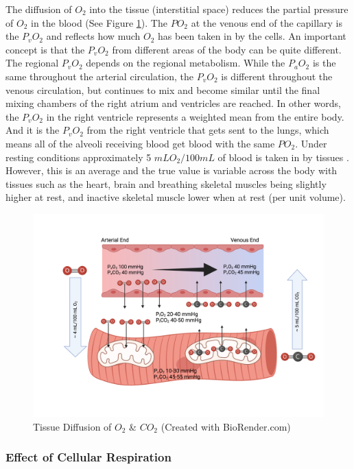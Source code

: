The diffusion of $O_2$ into the tissue (interstitial space) reduces the partial pressure of $O_2$ in the blood (See Figure \ref{fig:tissue_diffusion}). The $PO_2$ at the venous end of the capillary is the $P_vO_2$ and reflects how much $O_2$ has been taken in by the cells. An important concept is that the $P_vO_2$ from different areas of the body can be quite different. The regional $P_vO_2$ depends on the regional metabolism. While the $P_aO_2$ is the same throughout the arterial circulation, the $P_vO_2$ is different throughout the venous circulation, but continues to mix and become similar until the final mixing chambers of the right atrium and ventricles are reached. In other words, the $P_vO_2$ in the right ventricle represents a weighted mean from the entire body. And it is the $P_vO_2$ from the right ventricle that gets sent to the lungs, which means all of the alveoli receiving blood get blood with the same $PO_2$. Under resting conditions approximately 5 $mL O_2 / 100 mL$ of blood is taken in by tissues \cite{hall_guyton_2020}. However, this is an average and the true value is variable across the body with tissues such as the heart, brain and breathing skeletal muscles being slightly higher at rest, and inactive skeletal muscle lower when at rest (per unit volume).

\begin{figure}[!h]
    \centering
    \includegraphics[width=1.0\linewidth]{./figure/tissue_diffusion.png}
    \caption{Tissue Diffusion of $O_2$ \& $CO_2$ \footnotesize{(Created with BioRender.com)}}
    \label{fig:tissue_diffusion}
\end{figure}

\subsubsection{Effect of Cellular Respiration}

